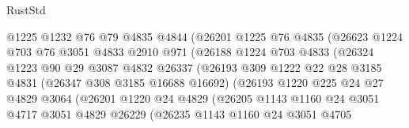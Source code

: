 \begin{lexlean}{RustStd}
\begin{coremodule}
                          @1225
                          @1232
                          @76
                          @79
                          @4835
                          @4844
                          (@26201
                            @1225
                            @76
                            @4835
                            (@26623
                              @1224
                              @703
                              @76
                              @3051
                              @4833
                              @2910
                              @971
                              (@26188
                                @1224
                                @703
                                @4833
                                (@26324
                                  @1223
                                  @90
                                  @29
                                  @3087
                                  @4832
                                  @26337
                                  (@26193
                                    @309
                                    @1222
                                    @22
                                    @28
                                    @3185
                                    @4831
                                    (@26347 @308 @3185 @16688 @16692)
                                    (@26193
                                      @1220
                                      @225
                                      @24
                                      @27
                                      @4829
                                      @3064
                                      (@26201
                                        @1220
                                        @24
                                        @4829
                                        (@26205
                                          @1143
                                          @1160
                                          @24
                                          @3051
                                          @4717
                                          @3051
                                          @4829
                                          @26229
                                          (@26235
                                            @1143
                                            @1160
                                            @24
                                            @3051
                                            @4705

\end{coremodule}
\end{lexlean}

